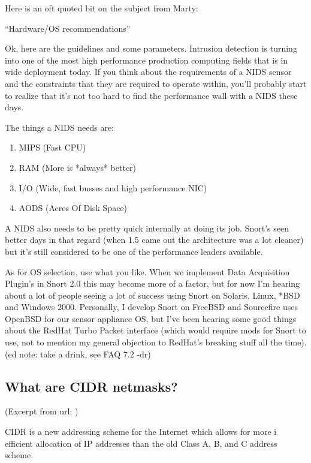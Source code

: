 \documentclass{article}
\begin{document}
Here is an oft quoted bit on the subject from Marty:

``Hardware/OS recommendations''

Ok, here are the guidelines and some parameters. Intrusion detection is turning
into one of the most high performance production computing fields that is in
wide deployment today. If you think about the requirements of a NIDS sensor and
the constraints that they are required to operate within, you'll probably start
to realize that it's not too hard to find the performance wall with a NIDS
these days.

The things a NIDS needs are:
\begin{enumerate}
\item  MIPS (Fast CPU)
\item  RAM (More is *always* better)
\item  I/O (Wide, fast busses and high performance NIC)
\item  AODS (Acres Of Disk Space)
\end{enumerate}

A NIDS also needs to be pretty quick internally at doing its job. Snort's seen
better days in that regard (when 1.5 came out the architecture was a lot
cleaner) but it's still considered to be one of the performance leaders
available.

As for OS selection, use what you like. When we implement Data Acquisition
Plugin's in Snort 2.0 this may become more of a factor, but for now I'm hearing
about a lot of people seeing a lot of success using Snort on Solaris, Linux,
*BSD and Windows 2000. Personally, I develop Snort on FreeBSD and Sourcefire
uses OpenBSD for our sensor appliance OS, but I've been hearing some good
things about the RedHat Turbo Packet interface (which would require mods for
Snort to use, not to mention my general objection to RedHat's breaking stuff
all the time). (ed note: take a drink, see FAQ 7.2 -dr)

\subsection{What are CIDR netmasks? }

(Excerpt from url: )

CIDR is a new addressing scheme for the Internet which allows for more i
efficient allocation of IP addresses than the old Class A, B, and C address 
scheme.
\end{document}
